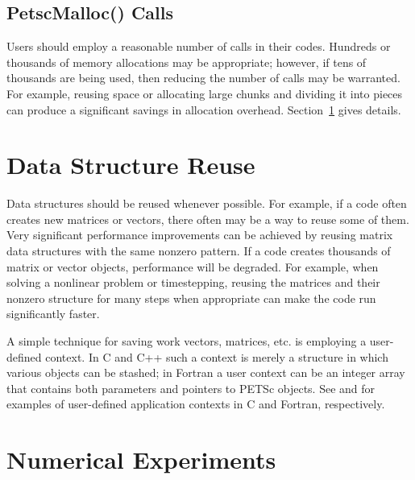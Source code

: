 \subsection{PetscMalloc() Calls}
Users should employ a reasonable number of  calls in their codes.
Hundreds or thousands of memory allocations may be appropriate; however, if tens of 
thousands are being used, then reducing the number of  calls
may be warranted.  For example, reusing space or allocating large chunks 
and dividing it into pieces can produce a significant savings in 
allocation overhead.  Section~\ref{sec:dsreuse} gives details.

\section{Data Structure Reuse}
\label{sec:dsreuse}

Data structures should be reused whenever possible.  For example, if a code often
creates new matrices or vectors, there often may be a way to reuse some
of them.  Very significant performance improvements can be achieved by
reusing matrix data structures with the same nonzero pattern.  If a code
creates thousands of matrix or vector objects, performance will be
degraded.  For example, when solving a nonlinear problem or timestepping,
reusing the matrices and their nonzero structure for many steps when
 appropriate can make the code run significantly faster.  

A simple technique for saving work vectors, matrices, etc. is employing
a user-defined context.  In C and C++ such a context is merely a
structure in which various objects can be stashed; in Fortran a user
context can be an integer array that contains both parameters and pointers
to PETSc objects. See  and 
 for examples of user-defined application
contexts in C and Fortran, respectively.

\section{Numerical Experiments}


